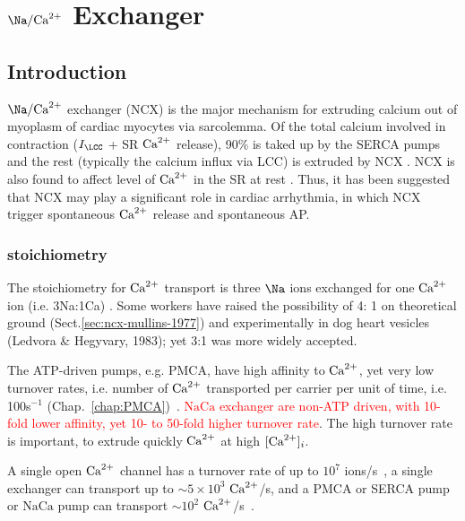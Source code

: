 \chapter{$\Na/\Ca$ Exchanger}
\label{chap:NCX}

\def\NaCa{{\text{NaCa}}}

\section{Introduction}

$\Na/\Ca$ exchanger (NCX) is the major mechanism for extruding calcium out of
myoplasm of cardiac myocytes via sarcolemma. Of the total calcium involved in
contraction ($I_\LCC$ + SR ${\text{Ca}^{2+}}$ release), 90\% is taked up by the SERCA pumps
and the rest (typically the calcium influx via LCC) is extruded by NCX
\citep{bers2002ncx}.  NCX is also found to affect level of ${\text{Ca}^{2+}}$ in the SR at
rest \citep{blaustein1999}. Thus, it has been suggested that NCX may play a
significant role in cardiac arrhythmia, in which NCX trigger spontaneous ${\text{Ca}^{2+}}$
release and spontaneous AP.



\subsection{stoichiometry}
\label{sec:NCX-stoichiometry}

The stoichiometry for ${\text{Ca}^{2+}}$ transport is three $\Na$ ions exchanged for one
${\text{Ca}^{2+}}$ ion (i.e. 3Na:1Ca) \citep{reeves1984}. Some workers have raised the
possibility of 4: 1 on theoretical ground (Sect.\ref{sec:ncx-mullins-1977}) and
experimentally in dog heart vesicles (Ledvora \& Hegyvary, 1983); yet 3:1 was
more widely accepted.

The ATP-driven pumps, e.g. PMCA, have high affinity to ${\text{Ca}^{2+}}$, yet very
low turnover rates, i.e. number of ${\text{Ca}^{2+}}$ transported per carrier per
unit of time, i.e. 100s$^{-1}$
(Chap.~\ref{chap:PMCA})~\citep{blaustein1999}.
\textcolor{red}{$\NaCa$ exchanger are non-ATP driven, with 10-fold lower
  affinity, yet 10- to 50-fold higher turnover rate}. The high
turnover rate is important, to extrude quickly ${\text{Ca}^{2+}}$ at high
$[{\text{Ca}^{2+}}]_i$. 

\begin{framed}
  A single open ${\text{Ca}^{2+}}$ channel has a turnover rate of up to $10^7$
  ions/s~\citep{hille1992mb}, a single exchanger can transport up to
  $\sim 5\times 10^3$ ${\text{Ca}^{2+}}$/s, and a PMCA or SERCA pump or $\NaCa$ pump
  can transport $\sim 10^2$ ${\text{Ca}^{2+}}$/s~\citep{stein1986}.
\end{framed}

